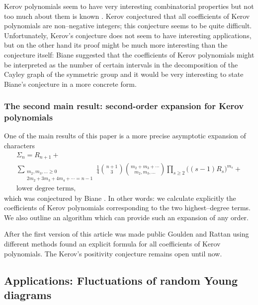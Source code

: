 \documentclass[12pt,dvips]{amsart}
\numberwithin{equation}{section} \numberwithin{figure}{section}
\theoremstyle{plain}
\theoremstyle{definition}
\theoremstyle{remark}
\newcommand{\Sn}[1]{{{S}}_{#1}}
\begin{document}
Kerov polynomials seem to have very interesting combinatorial
properties but not too much about them is known
\cite{BianeCharacters,StanleyRectangularCharacters,
StanleySlajdyKerov}. Kerov  conjectured
that all coefficients of Kerov polynomials are non--negative
integers; this conjecture seems to be quite difficult.
Unfortunately, Kerov's conjecture does not seem to have interesting
applications, but on the other hand its proof might be much more
interesting than the conjecture itself: Biane  \cite{BianeCharacters} suggested that the coefficients
of Kerov polynomials might be interpreted as the number of certain
intervals in the decomposition of the Cayley graph of the symmetric
group and it would be very interesting to state Biane's conjecture
in a more concrete form.

\subsubsection{The second main result: second-order expansion for Kerov polynomials}
One of the main results of this paper is a more precise asymptotic
expansion of characters
\begin{multline}
\Sigma_{n}=%
  R_{n+1}+ \\  \sum_{\substack{m_2,m_3,\dots\geq 0 \\
                  2m_2+3 m_3+4 m_4+\cdots=n-1}}\!\!
            \frac{1}{4} \binom{n+1}{3} \binom{m_2+m_3+\cdots}{m_2,m_3,\dots}
                    \prod_{s\geq 2} \big( (s-1) R_s \big)^{m_s} +\\ \text{lower degree terms},
\label{eq:asymptotyka1}
 \end{multline}
which was conjectured by Biane \cite{BianeCharacters}. In other
words: we calculate explicitly the coefficients of Kerov polynomials
corresponding to the two highest--degree terms. We also outline an
algorithm which can provide such an expansion of any order.

After the first version of this article was made public
\cite{Sniady2003HigherOrder,Sniady2003pushing} Goulden and Rattan
\cite{GouldenRattan05} using different methods found an explicit
formula for all coefficients of Kerov polynomials. The Kerov's
positivity conjecture remains open until now.


\subsection{Applications: Fluctuations of random Young diagrams}
\end{document}
